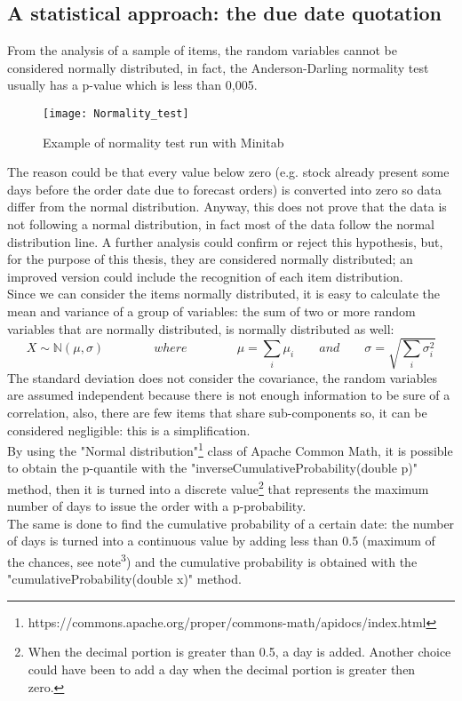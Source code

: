 \documentclass[a4paper,12pt]{article}
\begin{document}
\subsection{A statistical approach: the due date quotation}
From the analysis of a sample of items, the random variables cannot be considered normally distributed, in fact, the Anderson-Darling normality test usually has a p-value which is less than 0,005.\\
\begin{figure}[H]
	\begin{center}
		\texttt{[image: Normality\_test]}
		\caption{Example of normality test run with Minitab\textsuperscript{\textregistered}}
	\end{center}
\end{figure}
The reason could be that every value below zero (e.g. stock already present some days before the order date due to forecast orders) is converted into zero so data differ from the normal distribution. Anyway, this does not prove that the data is not following a normal distribution, in fact most of the data follow the normal distribution line. A further analysis could confirm or reject this hypothesis, but, for the purpose of this thesis, they are considered normally distributed; an improved version could include the recognition of each item distribution.\\
Since we can consider the items normally distributed, it is easy to calculate the mean and variance of a group of variables: the sum of two or more random variables that are normally distributed, is normally distributed as well:
\begin{equation*}
X \sim \mathbb{N}(\mu, \sigma)		\qquad \qquad where \qquad \qquad		\mu = \sum_{i} \mu_{i} 		 \qquad and\qquad			\sigma = \sqrt{\sum_{i} \sigma_{i}^{2}}
\end{equation*}
The standard deviation does not consider the covariance, the random variables are assumed independent because there is not enough information to be sure of a correlation, also, there are few items that share sub-components so, it can be considered negligible: this is a simplification. \\

By using the "Normal distribution"\footnote{https://commons.apache.org/proper/commons-math/apidocs/index.html} class of Apache Common Math, it is possible to obtain the p-quantile with the "inverseCumulativeProbability(double p)" method, then it is turned into a discrete value\footnote{When the decimal portion is greater than 0.5, a day is added. Another choice could have been to add a day when the decimal portion is greater then zero.} that represents the maximum number of days to issue the order with a p-probability. \\
The same is done to find the cumulative probability of a certain date: the number of days is turned into a continuous value by adding less than 0.5 (maximum of the chances, see note\textsuperscript{3}) and the cumulative probability is obtained with the "cumulativeProbability(double x)" method.
\end{document}
